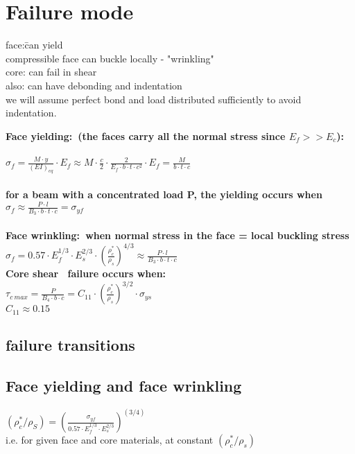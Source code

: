 \documentclass[12pt]{article}
\begin{document}
\section{Failure mode}
\begin{tabbing}
face:\hspace{1cm}\=can yield\\
\>compressible face can buckle locally - "wrinkling"\\
core: \>can fail in shear\\
also: \>can have debonding and indentation\\
\>we will assume perfect bond and load distributed sufficiently to avoid indentation.
\end{tabbing}
\noindent
\bf Face yielding:\normalfont\  (the faces carry all the normal stress since $E_f >> E_c$):\\
\\
\Large
\indent $\sigma_f=\frac{M\cdot y}{(EI)_{eq}}\cdot E_f \approx
M \cdot \frac{c}{2} \cdot \frac{2}{E_f \cdot b \cdot t \cdot c^2}  \cdot E_f =
\frac{M}{b\cdot t \cdot c}
$\\
\\
\normalsize for a beam with a concentrated load P, the yielding occurs when\\
\Large
\indent $\sigma_f \approx \frac{P \cdot l}{B_3 \cdot b \cdot t \cdot c} = \sigma_{yf} $\\
\\
\normalsize
\bf Face wrinkling:\normalfont\  when normal stress in the face = local buckling stress\\
\vspace{.5cm}
\Large
\indent $\sigma_f=0.57 \cdot E_f^{1/3} \cdot E_s^{2/3}
\cdot (\frac{\rho_c^*}{\rho_s})^{4/3} \approx \frac{P\cdot l}{B_3\cdot b \cdot t \cdot c}$\\
\noindent \normalsize
\vspace{.3cm}
\bf Core shear \normalfont \ failure occurs when:\\
\vspace{.3cm}
\Large
\indent $\tau_{c\ max} = \frac{P}{B_4 \cdot b \cdot c}=C_{11} \cdot (\frac{\rho_c^*}{\rho_s})^{3/2}
\cdot \sigma_{ys}$\\
\vspace{.3cm}
\large
\indent $C_{11}\approx 0.15$\\
\subsection{failure transitions}
\subsection{Face yielding and face wrinkling}
\LARGE
\indent $(\rho_c^*/\rho_S)=
	(\frac {\sigma_{yf}}
	{ 0.57 \cdot E_f^{1/3}
	 \cdot E_s^{2/3}}   )^{(3/4) }$
\\ \normalsize
i.e. for given face and core materials, at constant $(\rho^*_c / \rho_s)$
\end{document}
